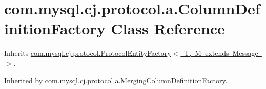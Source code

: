 \hypertarget{classcom_1_1mysql_1_1cj_1_1protocol_1_1a_1_1_column_definition_factory}{}\section{com.\+mysql.\+cj.\+protocol.\+a.\+Column\+Definition\+Factory Class Reference}
\label{classcom_1_1mysql_1_1cj_1_1protocol_1_1a_1_1_column_definition_factory}


Inherits \mbox{\hyperlink{interfacecom_1_1mysql_1_1cj_1_1protocol_1_1_protocol_entity_factory}{com.\+mysql.\+cj.\+protocol.\+Protocol\+Entity\+Factory$<$ T, M extends Message $>$}}.



Inherited by \mbox{\hyperlink{classcom_1_1mysql_1_1cj_1_1protocol_1_1a_1_1_merging_column_definition_factory}{com.\+mysql.\+cj.\+protocol.\+a.\+Merging\+Column\+Definition\+Factory}}.

